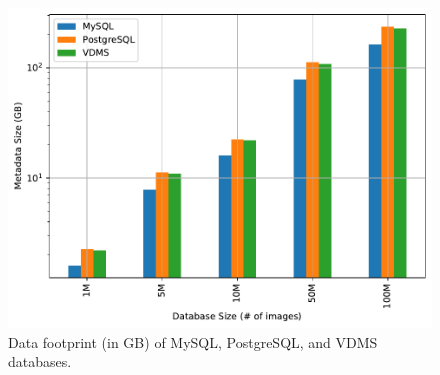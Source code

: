 
\begin{figure}[ht]
\centering
\includegraphics[width=0.8\columnwidth]{figures/all_build_sizes_plot}
\caption{Data footprint (in GB) of MySQL, PostgreSQL, and VDMS databases.}
\label{fig:db_sizes}
\end{figure}




